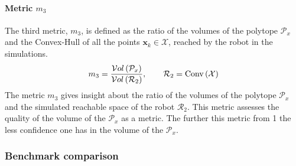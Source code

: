 \paragraph*{Metric $m_3$}  The third metric, $m_3$, is defined as the ratio of the volumes of the polytope $\mathcal{P}_x$ and the Convex-Hull of all the points $\bm{x}_k\in\mathcal{X}$, reached by the robot in the simulations.
\begin{equation}
    m_3 = \frac{\mathcal{V}ol\left(\mathcal{P}_x\right)}{\mathcal{V}ol\left( \mathcal{R}_2 \right)}, \qquad \mathcal{R}_2 = \text{Conv}\left(\mathcal{X}\right)
\end{equation}
The metric $m_3$ gives insight about the ratio of the volumes of the polytope $\mathcal{P}_x$ and the simulated reachable space of the robot $\mathcal{R}_2$. This metric assesses the quality of the volume of the $\mathcal{P}_x$ as a metric. The further this metric from 1 the less confidence one has in the volume of the $\mathcal{P}_x$.

\subsubsection{Benchmark comparison}

